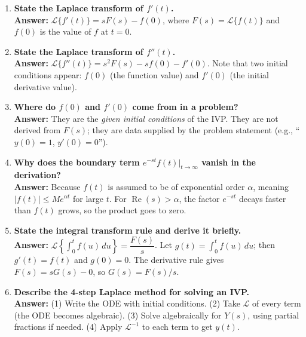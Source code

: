 \documentclass[12pt,a4paper]{article}
\begin{document}
\begin{enumerate}[label=\textbf{Q\arabic*.}]

\item \textbf{State the Laplace transform of \(f'(t)\).}\\
      \textbf{Answer:} \(\mathcal{L}\{f'(t)\} = sF(s) - f(0)\), where \(F(s)=\mathcal{L}\{f(t)\}\)
      and \(f(0)\) is the value of \(f\) at \(t=0\).

\item \textbf{State the Laplace transform of \(f''(t)\).}\\
      \textbf{Answer:} \(\mathcal{L}\{f''(t)\} = s^2F(s) - sf(0) - f'(0)\).
      Note that two initial conditions appear: \(f(0)\) (the function value) and
      \(f'(0)\) (the initial derivative value).

\item \textbf{Where do \(f(0)\) and \(f'(0)\) come from in a problem?}\\
      \textbf{Answer:} They are the \emph{given initial conditions} of the IVP.
      They are not derived from \(F(s)\); they are data supplied by the problem statement
      (e.g., ``\(y(0)=1\), \(y'(0)=0\)'').

\item \textbf{Why does the boundary term \(e^{-st}f(t)\big|_{t\to\infty}\) vanish in the derivation?}\\
      \textbf{Answer:} Because \(f(t)\) is assumed to be of exponential order \(\alpha\),
      meaning \(|f(t)| \leq M e^{\alpha t}\) for large \(t\).
      For \(\operatorname{Re}(s) > \alpha\), the factor \(e^{-st}\) decays faster than
      \(f(t)\) grows, so the product goes to zero.

\item \textbf{State the integral transform rule and derive it briefly.}\\
      \textbf{Answer:} \(\mathcal{L}\!\left\{\int_0^t f(u)\,du\right\} = \dfrac{F(s)}{s}\).
      Let \(g(t)=\int_0^t f(u)\,du\); then \(g'(t)=f(t)\) and \(g(0)=0\).
      The derivative rule gives \(F(s) = sG(s) - 0\), so \(G(s)=F(s)/s\).

\item \textbf{Describe the 4-step Laplace method for solving an IVP.}\\
      \textbf{Answer:} (1) Write the ODE with initial conditions.
      (2) Take \(\mathcal{L}\) of every term (the ODE becomes algebraic).
      (3) Solve algebraically for \(Y(s)\), using partial fractions if needed.
      (4) Apply \(\mathcal{L}^{-1}\) to each term to get \(y(t)\).


\end{enumerate}
\end{document}

